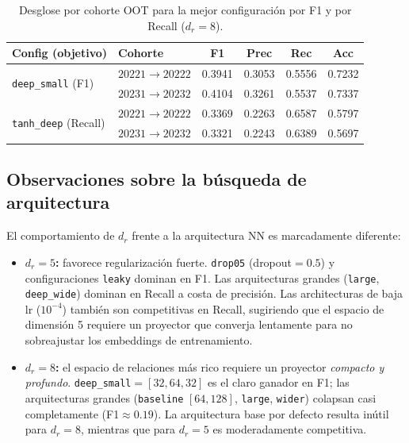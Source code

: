 \documentclass[11pt,a4paper]{article}
\begin{document}
\begin{table}[H]
\centering
\caption{Desglose por cohorte OOT para la mejor configuración por F1 y por Recall ($d_r=8$).}
\label{tab:detalle_rdim8}
\begin{tabular}{llcccc}
\toprule
\textbf{Config (objetivo)} & \textbf{Cohorte} & \textbf{F1} & \textbf{Prec} & \textbf{Rec} & \textbf{Acc} \\
\midrule
\multirow{2}{*}{\texttt{deep\_small} (F1)}
  & $20221 \to 20222$ & 0.3941 & 0.3053 & 0.5556 & 0.7232 \\
  & $20231 \to 20232$ & 0.4104 & 0.3261 & 0.5537 & 0.7337 \\
\midrule
\multirow{2}{*}{\texttt{tanh\_deep} (Recall)}
  & $20221 \to 20222$ & 0.3369 & 0.2263 & 0.6587 & 0.5797 \\
  & $20231 \to 20232$ & 0.3321 & 0.2243 & 0.6389 & 0.5697 \\
\bottomrule
\end{tabular}
\end{table}

\subsection{Observaciones sobre la búsqueda de arquitectura}

El comportamiento de $d_r$ frente a la arquitectura NN es marcadamente diferente:

\begin{itemize}
    \item \textbf{$d_r=5$:} favorece regularización fuerte.
    \texttt{drop05} (dropout$=0.5$) y configuraciones \texttt{leaky} dominan en F1.
    Las arquitecturas grandes (\texttt{large}, \texttt{deep\_wide}) dominan en Recall
    a costa de precisión. Las architecturas de baja lr ($10^{-4}$) también son
    competitivas en Recall, sugiriendo que el espacio de dimensión 5 requiere un
    proyector que converja lentamente para no sobreajustar los embeddings de entrenamiento.
    \item \textbf{$d_r=8$:} el espacio de relaciones más rico requiere un proyector
    \emph{compacto y profundo}. \texttt{deep\_small}$=[32, 64, 32]$ es el claro ganador en F1;
    las arquitecturas grandes (\texttt{baseline} $[64, 128]$, \texttt{large}, \texttt{wider})
    colapsan casi completamente (F1$\approx 0.19$). La arquitectura base por defecto
    resulta inútil para $d_r=8$, mientras que para $d_r=5$ es moderadamente competitiva.
\end{itemize}
\end{document}
